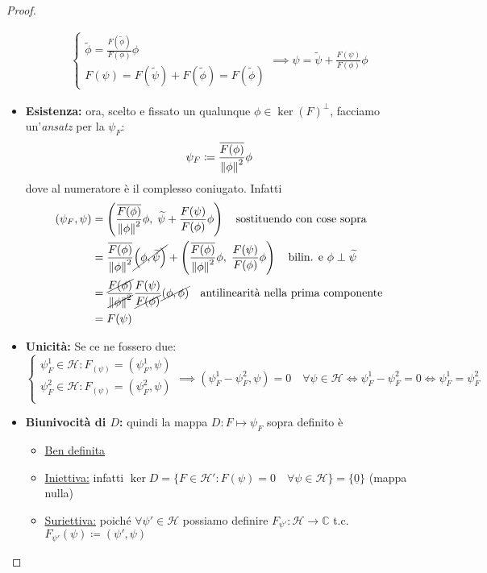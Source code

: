 \documentclass[a4paper,10pt]{article}
\theoremstyle{definition}
\newcommand{\im}{\mathbb{C}} %
\newcommand{\hil}{\mathcal{H}} %
\theoremstyle{indentdefinition}
\theoremstyle{indenttheorem}
\theoremstyle{myremark}
\theoremstyle{indentgeneral}
\begin{document}
\begin{proof}
\begin{itemize}
\begin{align*}
\begin{cases}
                \widetilde{\phi}=\frac{F(\widetilde{\phi})}{F(\phi)}\phi\\
                F(\psi)=F(\widetilde{\psi})+ F(\widetilde{\phi})=F(\widetilde{\phi})
            \end{cases}\implies \psi=\widetilde{\psi}+\frac{F(\psi)}{F(\phi)}\phi
        \end{align*}
        \item \textbf{Esistenza:} ora, scelto e fissato un qualunque $\phi\in \ker (F)^\perp$, facciamo un'\textit{ansatz} per la $\psi_F$:
        $$\psi_F\coloneqq\frac{\overline{F(\phi)}}{\norm{\phi}^2}\phi$$
       dove al numeratore è il complesso coniugato. Infatti
       \begin{align*}
           (\psi_F,\psi)&=\left(\frac{\overline{F(\phi)}}{\norm{\phi}^2}\phi,\; \widetilde{\psi}+\frac{F(\psi)}{F(\phi)}\phi\right) \quad \text{sostituendo con cose sopra}\\
           &=\frac{\overline{F(\phi)}}{\norm{\phi}^2}\cancel{\left(\phi,\widetilde{\psi} \right)} +\left(\frac{\overline{F(\phi)}}{\norm{\phi}^2}\phi,\;\frac{F(\psi)}{F(\phi)}\phi\right) \quad\text{bilin. e }\phi\perp\widetilde{\psi}\\
           &=\frac{\cancel{{F(\phi)}}}{\cancel{\norm{\phi}^2}}\frac{F(\psi)}{\cancel{F(\phi)}}\cancel{\left(\phi,\phi\right)}\quad \text{antilinearità nella prima componente} \\
           &=F(\psi)
       \end{align*}
       \item \textbf{Unicità:} Se ce ne fossero due:
       $$\begin{cases}
           \psi_F^1\in\hil: F_(\psi)=( \psi_F^1,\psi) \\
           \psi_F^2\in\hil : F_(\psi)=( \psi_F^2,\psi)\\
           
       \end{cases}\implies ( \psi_F^1- \psi_F^2,\psi)=0\quad \forall\psi\in\hil\iff \psi_F^1- \psi_F^2=0\iff \psi_F^1= \psi_F^2$$
        \item \textbf{Biunivocità di $D$:} quindi la mappa $D:F\mapsto \psi_F$ sopra definito è
        \begin{itemize}
            \item \underline{Ben definita}
            \item \underline{Iniettiva:} infatti $\ker D=\{F\in\hil': F(\psi)=0\quad\forall\psi\in\hil\}=\{\underline{0}\}$ (mappa nulla)
            \item \underline{Suriettiva:} poiché $\forall\psi'\in\hil$ possiamo definire $F_{\psi'}:\hil\to \im$ t.c. $F_{\psi'}(\psi)\coloneqq(\psi',\psi)$
        \end{itemize}
    \end{itemize}
\end{proof}
\end{document}
